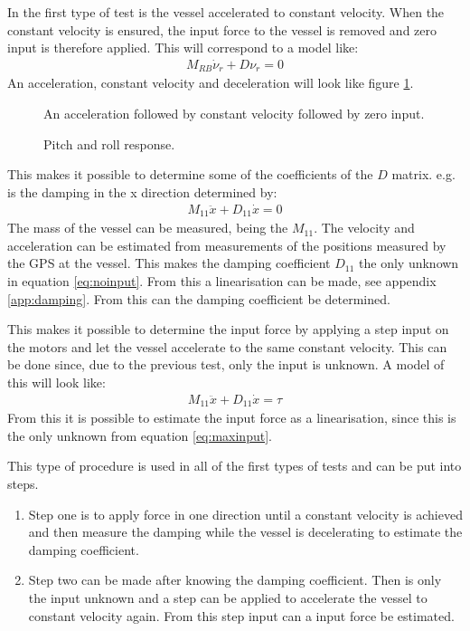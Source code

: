 In the first type of test is the vessel accelerated to constant velocity. When the constant velocity is ensured, the input force to the vessel is removed and zero input is therefore applied. This will correspond to a model like:
\begin{align}
M_{RB} \dot \nu_r + D\nu_r = 0
\label{eq:decelmodel}
\end{align}
An acceleration, constant velocity and deceleration will look like figure \ref{fig:acceldecel}.
\begin{figure}[htbp]
	\centering
	
	\caption{An acceleration followed by constant velocity followed by zero input.}
	\label{fig:acceldecel}
\end{figure}
\begin{figure}[htbp]
	\centering
	
	\caption{Pitch and roll response.}
	\label{fig:harmonic-damping}
\end{figure}
This makes it possible to determine some of the coefficients of the $D$ matrix. e.g. is the damping in the x direction determined by:
\begin{align} 
M_{11} \ddot x + D_{11} \dot x = 0
\label{eq:noinput}
\end{align}
The mass of the vessel can be measured, being the $M_{11}$. The velocity and acceleration can be estimated from measurements of the positions measured by the \ac{GPS} at the vessel. This makes the damping coefficient $D_{11}$ the only unknown in equation \ref{eq:noinput}. From this a linearisation can be made, see appendix \ref{app:damping}. From this can the damping coefficient be determined.

This makes it possible to determine the input force by applying a step input on the motors and let the vessel accelerate to the same constant velocity. This can be done since, due to the previous test, only the input is unknown. A model of this will look like:
\begin{align} 
M_{11} \ddot x + D_{11} \dot x = \tau
\label{eq:maxinput}
\end{align}
From this it is possible to estimate the input force as a linearisation, since this is the only unknown from equation \ref{eq:maxinput}.

This type of procedure is used in all of the first types of tests and can be put into steps.
\begin{enumerate}
	\item Step one is to apply force in one direction until a constant velocity is achieved and then measure the damping while the vessel is decelerating to estimate the damping coefficient.
	\item Step two can be made after knowing the damping coefficient. Then is only the input unknown and a step can be applied to accelerate the vessel to constant velocity again. From this step input can a input force be estimated.
\end{enumerate}


